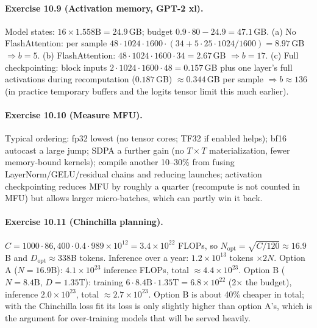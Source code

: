 \paragraph{Exercise 10.9 (Activation memory, GPT-2 xl).}
Model states: $16\times1.558\text{B}=24.9$\,GB; budget $0.9\cdot80-24.9=47.1$\,GB.
(a) No FlashAttention: per sample $48\cdot1024\cdot1600\cdot(34+5\cdot25\cdot1024/1600)=8.97$\,GB
$\Rightarrow b=5$. (b) FlashAttention: $48\cdot1024\cdot1600\cdot34=2.67$\,GB $\Rightarrow b=17$.
(c) Full checkpointing: block inputs $2\cdot1024\cdot1600\cdot48=0.157$\,GB plus one layer's full
activations during recomputation ($0.187$\,GB) $\approx0.344$\,GB per sample $\Rightarrow b\approx136$
(in practice temporary buffers and the logits tensor limit this much earlier).

\paragraph{Exercise 10.10 (Measure MFU).}
Typical ordering: fp32 lowest (no tensor cores; TF32 if enabled helps); bf16 autocast a large
jump; SDPA a further gain (no $T\times T$ materialization, fewer memory-bound kernels); compile
another 10--30\% from fusing LayerNorm/GELU/residual chains and reducing launches; activation
checkpointing reduces MFU by roughly a quarter (recompute is not counted in MFU) but allows larger
micro-batches, which can partly win it back.

\paragraph{Exercise 10.11 (Chinchilla planning).}
$C=1000\cdot86{,}400\cdot0.4\cdot989\times10^{12}=3.4\times10^{22}$ FLOPs, so
$N_{\text{opt}}=\sqrt{C/120}\approx16.9$B and $D_{\text{opt}}\approx338$B tokens.
Inference over a year: $1.2\times10^{13}$ tokens $\times2N$. Option A ($N=16.9$B):
$4.1\times10^{23}$ inference FLOPs, total $\approx4.4\times10^{23}$. Option B ($N=8.4$B,
$D=1.35$T): training $6\cdot8.4\text{B}\cdot1.35\text{T}=6.8\times10^{22}$ (2$\times$ the budget),
inference $2.0\times10^{23}$, total $\approx2.7\times10^{23}$. Option B is about 40\% cheaper in total;
with the Chinchilla loss fit its loss is only slightly higher than option A's, which is the
argument for over-training models that will be served heavily.


